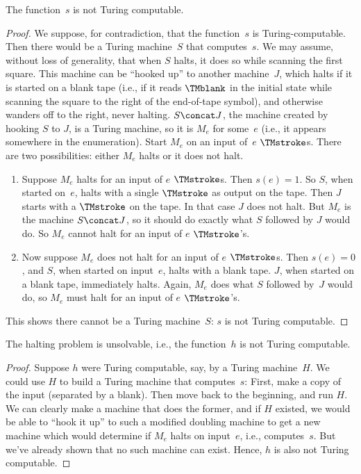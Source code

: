 \documentclass[../../../include/open-logic-section]{subfiles}
\begin{document}
\begin{lem}
The function~$s$ is not Turing computable.
\end{lem}

\begin{proof}
We suppose, for contradiction, that the function~$s$ is
Turing-computable.  Then there would be a Turing machine~$S$ that
computes~$s$. We may assume, without loss of generality, that when $S$
halts, it does so while scanning the first square.  This machine can
be ``hooked up'' to another machine~$J$, which halts if it is started on a
blank tape (i.e., if it reads $\TMblank$ in the initial state while
scanning the square to the right of the end-of-tape symbol), and
otherwise wanders off to the right, never halting. $S \concat J$, the
machine created by hooking $S$ to $J$, is a Turing machine, so it is
$M_e$ for some~$e$ (i.e., it appears somewhere in the enumeration). Start $M_e$
on an input of~$e$ $\TMstroke$s. There are two possibilities: either
$M_e$ halts or it does not halt.
\begin{enumerate}
\item Suppose $M_e$ halts for an input of $e$ $\TMstroke$s. Then $s(e)
  = 1$. So $S$, when started on~$e$, halts with a single $\TMstroke$
  as output on the tape.  Then $J$ starts with a $\TMstroke$ on the
  tape. In that case $J$ does not halt. But $M_e$ is the machine $S
  \concat J$, so it should do exactly what $S$ followed by $J$ would
  do.  So $M_e$ cannot halt for an input of $e$ $\TMstroke$'s.

\item Now suppose $M_e$ does not halt for an input of $e$
  $\TMstroke$s.  Then $s(e) = 0$, and $S$, when started on input~$e$,
  halts with a blank tape.  $J$, when started on a blank tape,
  immediately halts.  Again, $M_e$ does what $S$ followed by~$J$ would
  do, so $M_e$ must halt for an input of $e$ $\TMstroke$'s.
\end{enumerate}
This shows there cannot be a Turing machine~$S$: $s$ is not Turing
computable.
\end{proof}

\begin{thm}
 The halting problem is unsolvable, i.e.,
the function~$h$ is not Turing computable.
\end{thm}

\begin{proof}
Suppose $h$ were Turing computable, say, by a Turing machine~$H$.
We could use $H$ to build a Turing machine that computes~$s$: First,
make a copy of the input (separated by a blank). Then move back to the
beginning, and run $H$.  We can clearly make a machine that does the
former, and if $H$ existed, we would be able to ``hook it up'' to such
a modified doubling machine to get a new machine which would determine
if $M_e$ halts on input~$e$, i.e., computes~$s$. But we've already
shown that no such machine can exist. Hence, $h$ is also not Turing
computable.
\end{proof}
\end{document}
